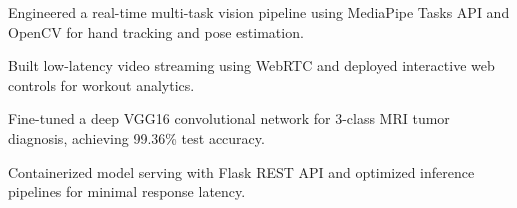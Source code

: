 \documentclass[../main.tex]{subfiles}
\begin{document}
\begin{tightemize}
\item Engineered a real-time multi-task vision pipeline using MediaPipe Tasks API and OpenCV for hand tracking and pose estimation.
\item Built low-latency video streaming using WebRTC and deployed interactive web controls for workout analytics.
\end{tightemize}
\sectionsep

\begin{tightemize}
\item Fine-tuned a deep VGG16 convolutional network for 3-class MRI tumor diagnosis, achieving 99.36\% test accuracy.
\item Containerized model serving with Flask REST API and optimized inference pipelines for minimal response latency.
\end{tightemize}
\end{document}
